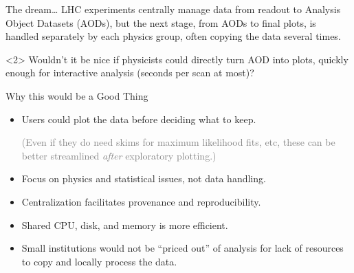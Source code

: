 \documentclass{beamer}
\begin{document}
\begin{frame}{The dream\ldots}
\vspace{0.5 cm}
LHC experiments centrally manage data from readout to Analysis Object Datasets (AODs), but the next stage, from AODs to final plots, is handled separately by each physics group, often copying the data several times.

\vspace{0.2 cm}

\vspace{0.5 cm}
\begin{uncoverenv}<2>
Wouldn't it be nice if physicists could directly turn AOD into plots, quickly enough for interactive analysis (seconds per scan at most)?
\end{uncoverenv}
\end{frame}

\begin{frame}{Why this would be a Good Thing}
\large
\vspace{0.5 cm}
\begin{itemize}\setlength{\itemsep}{0.5 cm}
\item Users could plot the data before deciding what to keep.

\vspace{0.2 cm}
\textcolor{gray}{\normalsize (Even if they do need skims for maximum likelihood fits, etc, these can be better streamlined {\it after} exploratory plotting.)}

\vspace{-0.2 cm}
\item Focus on physics and statistical issues, not data handling.
\item Centralization facilitates provenance and reproducibility.
\item Shared CPU, disk, and memory is more efficient.
\item Small institutions would not be ``priced out'' of analysis for lack of resources to copy and locally process the data.
\end{itemize}
\end{frame}
\end{document}
